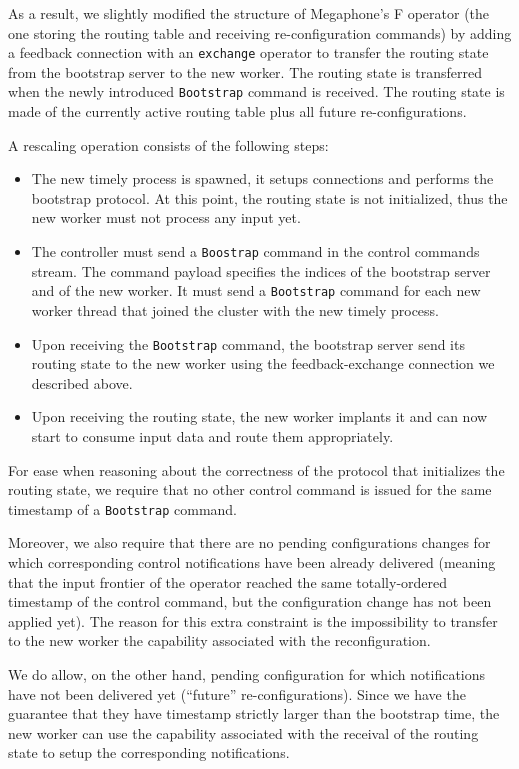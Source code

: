 \documentclass[12pt]{extarticle}
\begin{document}
As a result, we slightly modified the structure of Megaphone's F operator (the one storing the routing table
and receiving re-configuration commands) by adding a feedback connection with an \verb|exchange| operator
to transfer the routing state from the bootstrap server to the new worker. The routing state is transferred
when the newly introduced \verb|Bootstrap| command is received.
The routing state is made of the currently active routing table plus all future re-configurations.

\vspace{3mm}
\noindent
A rescaling operation consists of the following steps:
\begin{itemize}
    \item The new timely process is spawned, it setups connections and performs the bootstrap protocol. At this
        point, the routing state is not initialized, thus the new worker must not process any input yet.
    \item The controller must send a \verb|Boostrap| command in the control commands stream. The command
        payload specifies the indices of the bootstrap server and of the new worker. It must send a \verb|Bootstrap| command
        for each new worker thread that joined the cluster with the new timely process.
    \item Upon receiving the \verb|Bootstrap| command, the bootstrap server send its routing state to the
        new worker using the feedback-exchange connection we described above.
    \item Upon receiving the routing state, the new worker implants it and can now start to consume input data
        and route them appropriately.
\end{itemize}

For ease when reasoning about the correctness of the protocol that initializes the routing state,
we require that no other control command is issued for the same timestamp of a \verb|Bootstrap| command.

Moreover, we also require that there are no pending configurations changes for which corresponding
control notifications have been already delivered (meaning that the input frontier of the operator reached the
same totally-ordered timestamp of the control command, but the configuration change has not been applied yet).
The reason for this extra constraint is the impossibility to transfer to the new worker the capability associated with the
reconfiguration.

We do allow, on the other hand, pending configuration for which notifications have not been delivered yet (``future''
re-configurations). Since we have the guarantee that they have timestamp strictly larger than the bootstrap time,
the new worker can use the capability associated with the receival of the
routing state to setup the corresponding notifications.
\end{document}

